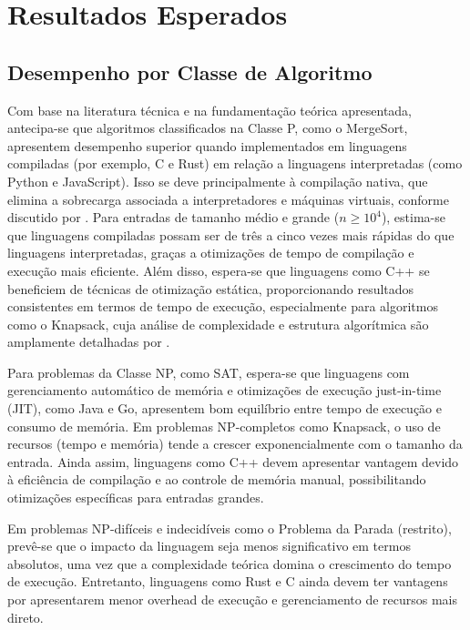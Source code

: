 \documentclass[12pt, a4paper]{article}
\begin{document}
\section{Resultados Esperados}

\subsection{Desempenho por Classe de Algoritmo}

Com base na literatura técnica  e na fundamentação teórica apresentada, antecipa-se que algoritmos classificados na Classe P, como o MergeSort, apresentem desempenho superior quando implementados em linguagens compiladas (por exemplo, C e Rust) em relação a linguagens interpretadas (como Python e JavaScript). Isso se deve principalmente à compilação nativa, que elimina a sobrecarga associada a interpretadores e máquinas virtuais, conforme discutido por . Para entradas de tamanho médio e grande (\( n \geq 10^4 \)), estima-se que linguagens compiladas possam ser de três a cinco vezes mais rápidas do que linguagens interpretadas, graças a otimizações de tempo de compilação e execução mais eficiente. Além disso, espera-se que linguagens como C++ se beneficiem de técnicas de otimização estática, proporcionando resultados consistentes em termos de tempo de execução, especialmente para algoritmos como o Knapsack, cuja análise de complexidade e estrutura algorítmica são amplamente detalhadas por .

Para problemas da Classe NP, como SAT, espera-se que linguagens com gerenciamento automático de memória e otimizações de execução just-in-time (JIT), como Java e Go, apresentem bom equilíbrio entre tempo de execução e consumo de memória. Em problemas NP-completos como Knapsack, o uso de recursos (tempo e memória) tende a crescer exponencialmente com o tamanho da entrada. Ainda assim, linguagens como C++ devem apresentar vantagem devido à eficiência de compilação e ao controle de memória manual, possibilitando otimizações específicas para entradas grandes.

Em problemas NP-difíceis e indecidíveis como o Problema da Parada (restrito), prevê-se que o impacto da linguagem seja menos significativo em termos absolutos, uma vez que a complexidade teórica domina o crescimento do tempo de execução. Entretanto, linguagens como Rust e C ainda devem ter vantagens por apresentarem menor overhead de execução e gerenciamento de recursos mais direto.
\end{document}
